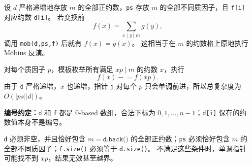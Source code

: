 设 $d$ 严格递增地存放 $m$ 的全部正约数，\texttt{ps} 存放 $m$ 的全部不同质因子，且 \texttt{f[i]} 对应约数 \texttt{d[i]}。
若变换前
\[
  f(x)=\sum_{x\mid y\mid m}g(y),
\]
调用 \texttt{mob(d,ps,f)} 后就有 $f(x)=g(x)$。
这相当于在 $m$ 的约数格上原地执行 Möbius 反演。

对每个质因子 $p$，模板枚举所有满足 $xp\mid m$ 的约数 $x$，执行
\[
  f(x)\mathrel{-}=f(xp).
\]
由于 \texttt{d} 严格递增，$x$ 也递增，指针 \texttt{j} 对每个 $p$ 只会单调前进，所以总复杂度为 $O(\lvert ps\rvert\lvert d\rvert)$。

\textbf{编号约定：}\texttt{d} 和 \texttt{f} 都是 $0$-based 数组，合法下标为 $0,1,\ldots,n-1$；\texttt{d[i]} 保存的约数值本身不是编号。

\begin{icpcwarning}
\texttt{d} 必须非空，并且恰好包含 $m=\texttt{d.back()}$ 的全部正约数；\texttt{ps} 必须恰好包含 $m$ 的全部不同质因子；\texttt{f.size()} 必须等于 \texttt{d.size()}。
不满足这些条件时，单调指针可能找不到 $x p$，结果无效甚至越界。
\end{icpcwarning}
